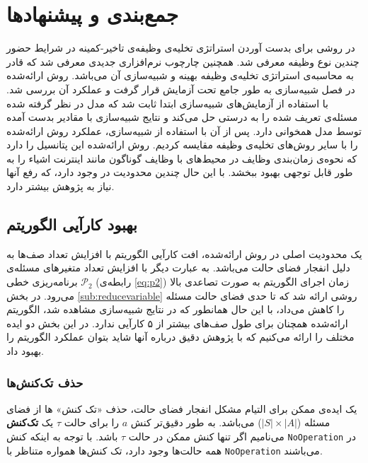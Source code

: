 \chapter{جمع‌بندی و پیشنهاد‌ها}
در \CurrentProject روشی برای بدست آوردن استراتژی تخلیه‌ی وظیفه‌ی تاخیر-کمینه در شرایط حضور چندین نوع وظیفه معرفی شد. همچنین چارچوب نرم‌افزاری جدیدی معرفی شد که قادر به محاسبه‌ی استراتژی تخلیه‌ی وظیفه بهینه و شبیه‌سازی آن می‌باشد. روش ارائه‌شده در فصل شبیه‌سازی به طور جامع تحت آزمایش قرار گرفت و عملکرد آن بررسی شد. با استفاده از آزمایش‌های شبیه‌سازی ابتدا ثابت شد که مدل در نظر گرفته شده مسئله‌ی تعریف شده را به درستی حل می‌کند و نتایج شبیه‌سازی با مقادیر بدست آمده توسط مدل همخوانی دارد. پس از آن با استفاده از شبیه‌سازی، عملکرد روش ارائه‌شده را با سایر روش‌های تخلیه‌ی وظیفه مقایسه کردیم. روش ارائه‌شده این پتانسیل را دارد که نحوه‌ی زمان‌بندی وظایف در محیط‌های با وظایف گوناگون مانند اینترنت اشیاء را به طور قابل توجهی بهبود ببخشد. با این حال چندین محدودیت در \CurrentProject وجود دارد، که رفع آنها نیاز به پژوهش بیشتر دارد. 

\section{بهبود کارآیی الگوریتم}
یک محدودیت اصلی در روش ارائه‌شده، افت کارآیی الگوریتم با افزایش تعداد صف‌ها به دلیل انفجار فضای حالت می‌باشد. به عبارت دیگر با افزایش تعداد متغیرهای مسئله‌ی برنامه‌ریزی خطی
$\mathcal{P}_2$
(رابطه‌ی \ref{eq:p2}) زمان اجرای الگوریتم به صورت تصاعدی بالا می‌رود. در بخش \ref{sub:reducevariable} روشی ارائه شد که تا حدی فضای حالت مسئله را کاهش می‌داد، با این حال همانطور که در نتایج شبیه‌سازی مشاهده شد، الگوریتم ارائه‌شده همچنان برای طول صف‌های بیشتر از ۵ کارآیی ندارد. در این بخش دو ایده مختلف را ارائه می‌کنیم که با پژوهش دقیق درباره آنها شاید بتوان عملکرد الگوریتم را بهبود داد.
\subsection{حذف تک‌کنش‌ها}
یک ایده‌ی ممکن برای التیام مشکل انفجار فضای حالت، حذف «تک کنش» ها از فضای مسئله ($|S| \times |A|$) می‌باشد. به طور دقیق‌تر کنش $a$ را برای حالت $\tau$ یک \textbf{تک‌کنش} می‌نامیم اگر تنها کنش ممکن در حالت $\tau$ باشد. با توجه به اینکه کنش \texttt{\footnotesize NoOperation} در همه حالت‌ها وجود دارد، تک کنش‌ها همواره متناظر با \texttt{\footnotesize NoOperation} می‌باشند. \\

